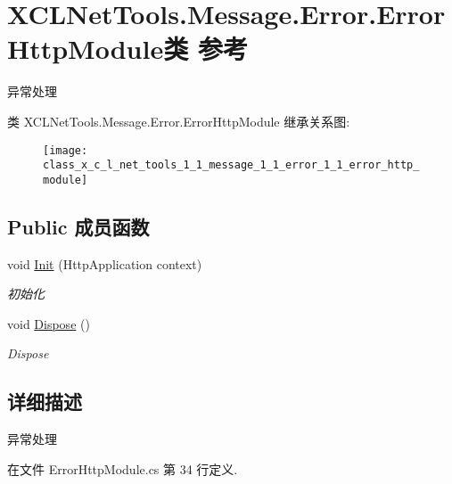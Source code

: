 \hypertarget{class_x_c_l_net_tools_1_1_message_1_1_error_1_1_error_http_module}{\section{X\-C\-L\-Net\-Tools.\-Message.\-Error.\-Error\-Http\-Module类 参考}
\label{class_x_c_l_net_tools_1_1_message_1_1_error_1_1_error_http_module}
}


异常处理  


类 X\-C\-L\-Net\-Tools.\-Message.\-Error.\-Error\-Http\-Module 继承关系图\-:\begin{figure}[H]
\begin{center}
\leavevmode
\texttt{[image: class\_x\_c\_l\_net\_tools\_1\_1\_message\_1\_1\_error\_1\_1\_error\_http\_module]}
\end{center}
\end{figure}
\subsection*{Public 成员函数}
\begin{DoxyCompactItemize}
\item 
void \hyperlink{class_x_c_l_net_tools_1_1_message_1_1_error_1_1_error_http_module_aa4e06d53382795826ed453b62afa265d}{Init} (Http\-Application context)
\begin{DoxyCompactList}\small\item\em 初始化 \end{DoxyCompactList}\item 
void \hyperlink{class_x_c_l_net_tools_1_1_message_1_1_error_1_1_error_http_module_a796d6d747b8620b5e260858e05abd09f}{Dispose} ()
\begin{DoxyCompactList}\small\item\em Dispose \end{DoxyCompactList}\end{DoxyCompactItemize}


\subsection{详细描述}
异常处理 



在文件 Error\-Http\-Module.\-cs 第 34 行定义.



